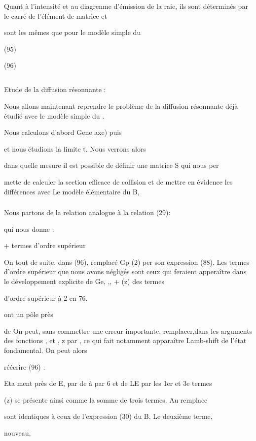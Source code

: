 Quant à l'intensité et au diagrenme d'émission de la raie, ils
sont déterminés par le carré de l'élément de matrice  et

sont les mêmes que pour le modèle simple du

(95)

(96)

\subsection{} Etude de la diffusion résonnante :%

Nous allons maintenant reprendre le problème de la diffusion
résonnante déjà étudié avec le modèle simple du .

Nous calculons d'abord Gene axe) puis

et nous étudions la limite t. Nous verrons alors

dans quelle mesure il est possible de définir une matrice S qui nous per

mette de calculer la section efficace de collision et de mettre en évidence
les différences avec Le modèle élémentaire du  B,
\subsubsection{}%
Nous partons de la relation analogue à la relation (29):

qui nous donne : 

+ termes d'ordre supérieur

On  tout de suite, dans (96), remplacé Gp (2) per son expression (88).
Les termes d'ordre supérieur que nous avons négligés sont ceux qui feraient
apperaître dans le développement explicite de Ge, ,, + (z) des termes

d'ordre supérieur à 2 en 76.

ont un pôle près

de  On peut, sans commettre une erreur importante, remplacer,dans
les arguments des fonctions , et , z par , ce qui fait notamment
apparaître  Lamb-shift de l'état fondamental. On peut alors

réécrire (96) :

Eta
ment près de E, par  de à par 6 et de LE par  les 1er et 3e termes

(z) se présente ainsi comme la somme de trois termes. Au remplace

sont identiques à ceux de l'expression (30) du  B. Le deuxième terme,

nouveau,

